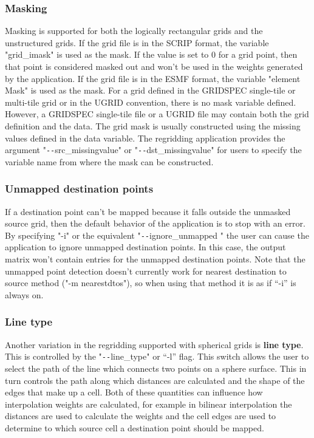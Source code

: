 \subsubsection{Masking}\label{sec:rwg_masking}
       Masking is supported for both the logically rectangular grids and the unstructured grids.
If the grid file is in the SCRIP format, the variable "grid\_imask" is used as the mask.
If the value is set to 0 for a grid point, then that point is considered masked out and
won't be used in the weights generated by the application. If the grid file is in the ESMF format, the variable "element Mask" is used as the mask.  For a grid defined in the GRIDSPEC
single-tile or multi-tile grid or in the UGRID convention, there is no mask variable defined.
However, a GRIDSPEC single-tile file or a UGRID file may contain both the grid definition and the data.
The grid mask is usually constructed using the missing values defined in the data variable.
The regridding application provides the argument "\verb+--+src\_missingvalue" or
"\verb+--+dst\_missingvalue" for users to specify the variable name from where the mask can be
constructed.

\subsubsection{Unmapped destination points}\label{sec:rwg_unmapped}
If a destination point can't be mapped because it falls outside the unmasked source grid, then the default behavior of the application is to stop with an error. By specifying "-i" or the equivalent "\verb+--+ignore\_unmapped " the user can cause the application to ignore unmapped destination points. In this case, the output matrix won't contain entries for the unmapped destination points. Note that the unmapped point detection doesn't
currently work for nearest destination to source method ("-m nearestdtos"), so when using that method it  is as if ``-i'' is always on.

\subsubsection{Line type}\label{sec:rwg_linetype}
 Another variation in the regridding supported with spherical grids is {\bf line type}. This is controlled by the "\verb+--+line\_type" or ``-l'' flag. This switch allows the user to select the path of the line which connects
two points on a sphere surface. This in turn controls the path along which distances are calculated and the shape of 
the edges that make up a cell. Both of these quantities can influence how interpolation weights are calculated, for example in
bilinear interpolation the distances are used to calculate the weights and the cell edges are used to determine to which source 
cell a destination point should be mapped. 

